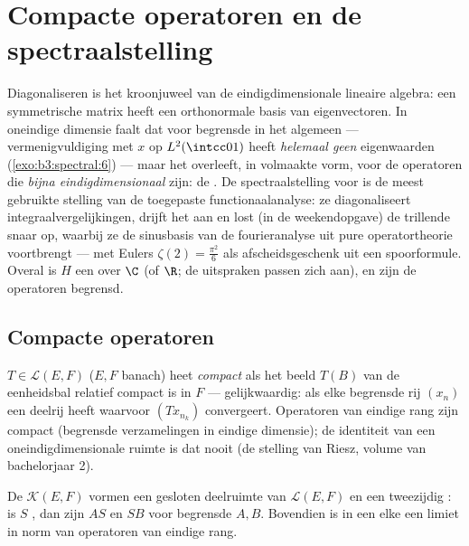 \chapter{Compacte operatoren en de spectraalstelling}
\label{ch:b3:spectral}

Diagonaliseren is het kroonjuweel van de eindigdimensionale
lineaire algebra: een symmetrische matrix heeft een orthonormale
basis van eigenvectoren. In oneindige dimensie faalt dat voor
begrensde  in het algemeen ---
vermenigvuldiging met $x$ op $L^2(\intcc01)$ heeft
\emph{helemaal geen} eigenwaarden (\cref{exo:b3:spectral:6}) ---
maar het overleeft, in volmaakte vorm, voor de operatoren die
\emph{bijna eindigdimensionaal} zijn: de . De
spectraalstelling voor   is de
meest gebruikte stelling van de toegepaste functionaalanalyse: ze
diagonaliseert integraalvergelijkingen, drijft het  aan en lost (in de weekendopgave) de trillende snaar
op, waarbij ze de sinusbasis van de fourieranalyse uit pure
operatortheorie voortbrengt --- met Eulers $\zeta(2) =
\frac{\pi^2}6$ als afscheidsgeschenk uit een spoorformule.
Overal is $H$ een  over $\C$ (of $\R$; de
uitspraken passen zich aan), en zijn de operatoren begrensd.

\section{Compacte operatoren}

\begin{definition}\label{def:b3:spectral:compact}
$T \in \mathcal L(E, F)$ ($E, F$ banach) heet
\emph{compact} als het beeld $T(B)$ van
de eenheidsbal relatief compact is in $F$ --- gelijkwaardig: als
elke begrensde rij $(x_n)$ een deelrij heeft waarvoor
$(Tx_{n_k})$ convergeert. Operatoren van eindige rang zijn
compact (begrensde verzamelingen in eindige dimensie); de
identiteit van een oneindigdimensionale ruimte is dat nooit (de
stelling van Riesz, volume van bachelorjaar 2).
\end{definition}

\begin{proposition}\label{prop:b3:spectral:ideal}
De  $\mathcal K(E, F)$ vormen een gesloten
deelruimte van $\mathcal L(E, F)$ en een tweezijdig : is
$S$ , dan zijn $AS$ en $SB$  voor begrensde $A, B$.
Bovendien is in een  elke  een
limiet in norm van operatoren van eindige rang.
\end{proposition}


